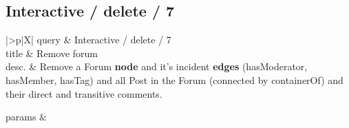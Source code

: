 \renewcommand*{\arraystretch}{1.1}

\subsection{Interactive / delete / 7}
\label{sec:interactive-delete-07}

\let\oldemph\emph
\renewcommand{\emph}[1]{{\footnotesize \sf #1}}

\renewcommand{\currentQueryCard}{7}


\noindent\begin{tabularx}{\queryCardWidth}{|>{\queryPropertyCell}p{\queryPropertyCellWidth}|X|}
	\hline
	query & Interactive / delete / 7 \\ \hline
%
	title & Remove forum \\ \hline
%
%
	desc. & Remove a \emph{Forum} \textbf{node} and it's incident \textbf{edges} (\emph{hasModerator}, \emph{hasMember}, \emph{hasTag}) and all \emph{Post} in the \emph{Forum} (connected by \emph{containerOf}) and their direct and transitive comments. 
 \\ \hline
%
	
		params &
		\innerCardVSpace \\ \hline
	
%
	
%
\end{tabularx}
\queryCardVSpace

\let\emph\oldemph